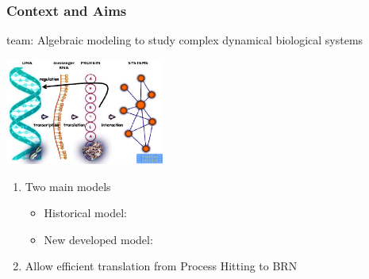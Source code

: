 
\begin{frame}[c]
  \frametitle{Context and Aims}

 team: Algebraic modeling to study complex dynamical biological systems

\begin{center}
  \includegraphics[height=3.5cm]{figs/dnascheme_white.png}
\end{center}

\pause
\begin{enumerate}[1)]
  \item Two main models
  \begin{itemize}
    \item Historical model: 
    \item New developed model: 
  \end{itemize}

\medskip
  \item Allow efficient translation from Process Hitting to BRN
\end{enumerate}

\end{frame}
